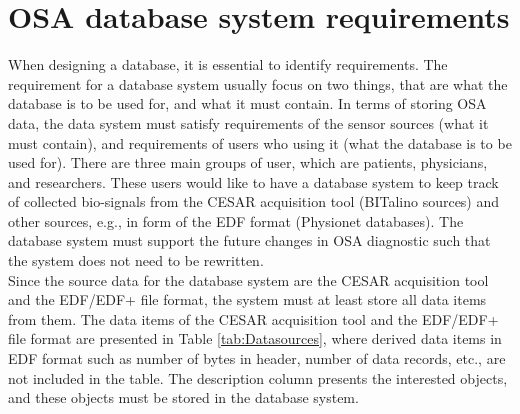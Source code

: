 \section{OSA database system requirements}
When designing a database, it is essential to identify requirements. The requirement for a database system usually focus on two things, that are what the database is to be used for, and what it must contain. In terms of storing OSA data, the data system must satisfy requirements of the sensor sources (what it must contain), and requirements of users who using it (what the database is to be used for). There are three main groups of user, which are patients, physicians, and researchers. These users would like to have a database system to keep track of collected bio-signals from the CESAR acquisition tool (BITalino sources) and other sources, e.g., in form of the EDF format (Physionet databases). The database system must support the future changes in OSA diagnostic such that the system does not need to be rewritten.\\
Since the source data for the database system are the CESAR acquisition tool and the EDF/EDF+ file format, the system must at least store all data items from them. The data items of the CESAR acquisition tool and the EDF/EDF+ file format are presented in Table \ref{tab:Datasources}, where derived data items in EDF format such as number of bytes in header, number of data records, etc., are not included in the table. The description column presents the interested objects, and these objects must be stored in the database system.\\
